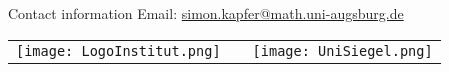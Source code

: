 \documentclass[final]{beamer}
\newlength{\onecolwid}
\begin{document}
\begin{frame}[t]
\begin{columns}[t]
\begin{column}{\onecolwid}


\begin{block}{Contact information}
Email: \href{mailto:simon.kapfer@math.uni-augsburg.de}{simon.kapfer@math.uni-augsburg.de}
\end{block}

\begin{center}
\begin{tabular}{ccc}
\texttt{[image: LogoInstitut.png]} & \hspace{4cm} & \texttt{[image: UniSiegel.png]}
\end{tabular}
\end{center}


\end{column} %

\end{columns} %
\end{frame} %
\end{document}
